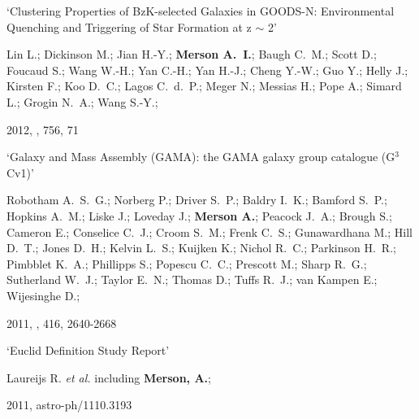 \begin{etaremune}[leftmargin=15pt]
\item \label{itm:Lin2012} `Clustering Properties of BzK-selected Galaxies in GOODS-N: Environmental Quenching and Triggering of Star Formation at z $\sim$ 2'\newline
  \begin{small}Lin L.; Dickinson M.; Jian H.-Y.; \textbf{Merson A.~I.}; Baugh C.~M.; Scott D.; Foucaud S.; Wang W.-H.; Yan C.-H.; Yan H.-J.; Cheng Y.-W.; Guo Y.; Helly J.; Kirsten F.; Koo D.~C.; Lagos C.~d.~P.; Meger N.; Messias H.; Pope A.; Simard L.; Grogin N.~A.; Wang S.-Y.;\end{small} 2012, \apj, 756, 71

\item \label{itm:Robotham2011} `Galaxy and Mass Assembly (GAMA): the GAMA galaxy group catalogue (G$^{3}$Cv1)'\newline
  \begin{small}Robotham A.~S.~G.; Norberg P.; Driver S.~P.; Baldry I.~K.; Bamford S.~P.; Hopkins A.~M.; Liske J.; Loveday J.; \textbf{Merson A.}; Peacock J.~A.; Brough S.; Cameron E.; Conselice C.~J.; Croom S.~M.; Frenk C.~S.; Gunawardhana M.; Hill D.~T.; Jones D.~H.; Kelvin L.~S.; Kuijken K.; Nichol R.~C.; Parkinson H.~R.; Pimbblet K.~A.; Phillipps S.; Popescu C.~C.; Prescott M.; Sharp R.~G.; Sutherland W.~J.; Taylor E.~N.; Thomas D.; Tuffs R.~J.; van Kampen E.; Wijesinghe D.;\end{small} 2011, \mnras, 416, 2640-2668

\item \label{itm:Laureijs2011} `Euclid Definition Study Report'\newline
  \begin{small}Laureijs R. \textit{et al.} including \textbf{Merson, A.};\end{small} 2011, astro-ph/1110.3193

\end{etaremune}
